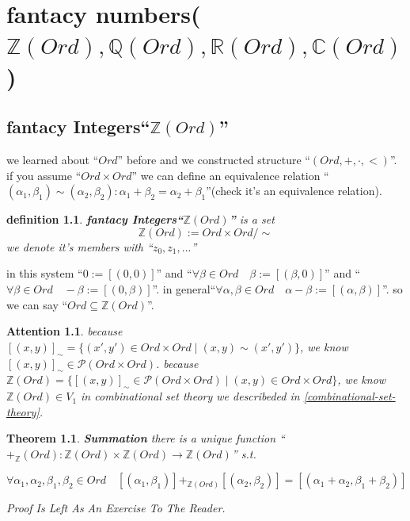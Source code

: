 \documentclass[10pt,a4paper]{book}
\newtheorem{definition}{definition}[section]
\newtheorem{theorem}{Theorem}[section]
\newtheorem{Attention}{Attention}[section]
\begin{document}
\chapter{fantacy numbers($ \mathbb{Z} (Ord) , \mathbb{Q} (Ord) ,\mathbb{R} (Ord) ,\mathbb{C} (Ord)$) }

\section{fantacy Integers``$\mathbb{Z} (Ord)$''}

we learned about ``$Ord$'' before and we constructed structure ``$(Ord , + ,
    \cdot , <)$''. if you assume ``$Ord \times Ord$'' we can define an equivalence
relation ``$ (\alpha_1 , \beta_1) \sim (\alpha_2 , \beta_2) : \alpha_1 +
    \beta_2 = \alpha_2 + \beta_1 $''(check it's an equivalence relation).

\begin{definition}\textbf{fantacy Integers``$\mathbb{Z} (Ord)$''} is a set
    \[ \mathbb{Z} (Ord) := Ord \times Ord / \sim\]
    we denote it's members with ``$z_0 , z_1 ,...$''
\end{definition}



in this system ``$ 0 := [(0,0)]$'' and ``$ \forall \beta \in Ord \quad \beta :=
        [( \beta ,0)]$'' and ``$\forall \beta \in Ord \quad - \beta := [(0, \beta)]$''.
in general``$\forall \alpha , \beta \in Ord \quad \alpha - \beta :=
        [(\alpha , \beta )]$''. so we can say ``$ Ord \subseteq \mathbb{Z} (Ord)$''.

\begin{Attention} because $[(x , y)]_\sim = \{ (x' , y') \in Ord \times Ord \mid (x , y) \sim (x' , y') \}$,
    we know  $[(x , y)]_\sim \in \mathcal{P} (Ord \times Ord)$.
    because $ \mathbb{Z} (Ord) = \{ [(x , y)]_\sim \in \mathcal{P} (Ord \times Ord) \mid (x , y) \in Ord \times Ord \}$,
    we know  $\mathbb{Z} (Ord) \in V_1$
    in combinational set theory we describeded in \ref{combinational-set-theory}.
\end{Attention}

\begin{theorem}\textbf{Summation} there is a unique function ``$+_\mathbb{Z} (Ord) :\mathbb{Z} (Ord) \times \mathbb{Z} (Ord) \to \mathbb{Z} (Ord)$'' s.t.

    \[ \forall \alpha_1 , \alpha_2 , \beta_1 , \beta_2 \in Ord \quad [(\alpha_1 , \beta_1)] +_{\mathbb{Z} (Ord)}  [(\alpha_2 , \beta_2)]  = [(\alpha_1 + \alpha_2, \beta_1 + \beta_2)] \]

    Proof Is Left As An Exercise To The Reader.
\end{theorem}
\end{document}
